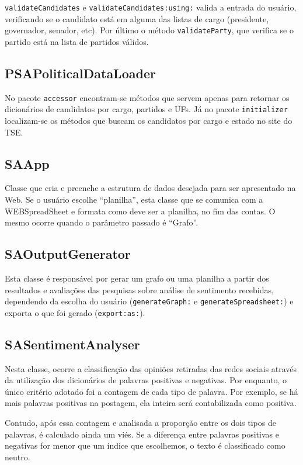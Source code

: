 \texttt{validateCandidates} e \texttt{validateCandidates:using:} valida a entrada do usuário, verificando se o candidato está em alguma das listas de cargo (presidente, governador, senador, etc). Por último o método \texttt{validateParty}, que verifica se o partido está na lista de partidos válidos.

\subsection{PSAPoliticalDataLoader}
No pacote \texttt{accessor} encontram-se métodos que servem apenas para retornar os dicionários de candidatos por cargo, partidos e UFs. Já no pacote \texttt{initializer} localizam-se os métodos que buscam os candidatos por cargo e estado no site do TSE.

\subsection{SAApp}
Classe que cria e preenche a estrutura de dados desejada para ser apresentado na Web. Se o usuário escolhe ``planilha'', esta classe que se comunica com a WEBSpreadSheet e formata como deve ser a planilha, no fim das contas. O mesmo ocorre quando o parâmetro passado é ``Grafo''.

\subsection{SAOutputGenerator}
Esta classe é responsável por gerar um grafo ou uma planilha a partir dos resultados e avaliações das pesquisas sobre análise de sentimento recebidas, dependendo da escolha do usuário (\texttt{generateGraph:} e \texttt{generateSpreadsheet:}) e exporta o que foi gerado (\texttt{export:as:}).

\subsection{SASentimentAnalyser}
Nesta classe, ocorre a classificação das opiniões retiradas das redes sociais através da utilização dos dicionários de palavras positivas e negativas. Por enquanto, o único critério adotado foi a contagem de cada tipo de palavra. Por exemplo, se há mais palavras positivas na postagem, ela inteira será contabilizada como positiva.

Contudo, após essa contagem e analisada a proporção entre os dois tipos de palavras, é calculado ainda um viés. Se a diferença entre palavras positivas e negativas for menor que um índice que escolhemos, o texto é classificado como neutro.

